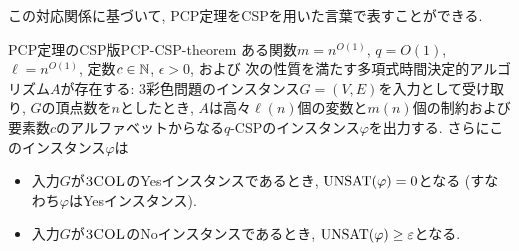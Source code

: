 この対応関係に基づいて, PCP定理をCSPを用いた言葉で表すことができる.

\begin{theorem}{PCP定理のCSP版}{PCP-CSP-theorem}
  ある関数$m=n^{O(1)}$, $q=O(1)$, $\ell=n^{O(1)}$, 定数$c\in\mathbb{N}$, $\epsilon>0$, および
  次の性質を満たす多項式時間決定的アルゴリズム$A$が存在する:
  3彩色問題のインスタンス$G=(V,E)$を入力として受け取り, $G$の頂点数を$n$としたとき, $A$は高々$\ell(n)$個の変数と$m(n)$個の制約および要素数$c$のアルファベットからなる$q$-CSPのインスタンス$\varphi$を出力する.
  さらにこのインスタンス$\varphi$は
  \begin{itemize}
  \item 入力$G$が$\textsc{3COL}$のYesインスタンスであるとき, $\mathrm{UNSAT}(\varphi) = 0$となる (すなわち$\varphi$はYesインスタンス).
  \item 入力$G$が$\textsc{3COL}$のNoインスタンスであるとき, $\mathrm{UNSAT}(\varphi) \ge \varepsilon$となる.
  \end{itemize}
\end{theorem}

